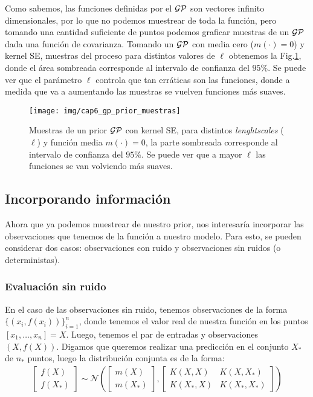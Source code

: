 Como sabemos, las funciones definidas por el $\mathcal{GP}$ son vectores infinito dimensionales, por lo que no podemos muestrear de toda la función, pero tomando una cantidad suficiente de puntos podemos graficar muestras de un $\mathcal{GP}$ dada una función de covarianza. Tomando un $\mathcal{GP}$ con media cero ($m(\cdot)=0$) y kernel SE, muestras del proceso para distintos valores de $\ell$ obtenemos la Fig.\ref{fig:gp_1}, donde el área sombreada corresponde al intervalo de confianza del $95\%$. Se puede ver que el parámetro $\ell$ controla que tan erráticas son las funciones, donde a medida que va a aumentando las muestras se vuelven funciones más suaves.

\begin{figure}[H]
	\centering
	\texttt{[image: img/cap6\_gp\_prior\_muestras]}
	\caption{Muestras de un prior $\mathcal{GP}$ con kernel SE, para distintos \textit{lenghtscales} ($\ell$) y función media $m(\cdot)=0$, la parte sombreada corresponde al intervalo de confianza del $95\%$. Se puede ver que a mayor $\ell$ las funciones se van volviendo más suaves.}
	\label{fig:gp_1}
\end{figure}

\subsection{Incorporando información}

Ahora que ya podemos muestrear de nuestro prior, nos interesaría incorporar las observaciones que tenemos de la función a nuestro modelo. Para esto, se pueden considerar dos casos: observaciones con ruido y observaciones sin ruidos (o deterministas).

\subsubsection{Evaluación sin ruido}

 En el caso de las observaciones sin ruido, tenemos observaciones de la forma $\{(x_i, f(x_i))\}_{i=1}^{n}$, donde tenemos el valor real de nuestra función en los puntos $[x_1, \ldots, x_n]=X$. Luego, tenemos el par de entradas y observaciones $(X,f(X))$. Digamos que queremos realizar una predicción en el conjunto $X_*$ de $n_*$ puntos, luego la distribución conjunta es de la forma:
\begin{align}
	\begin{bmatrix} f(X) \\ f(X_*)  \end{bmatrix}
	\sim \mathcal{N} \left(
	\begin{bmatrix} m(X) \\ m(X_*)  \end{bmatrix}, 
	\begin{bmatrix}
		K(X, X) & K(X, X_*) \\ K(X_*, X) & K(X_*, X_*)
	\end{bmatrix}
	 \right)
\end{align}

